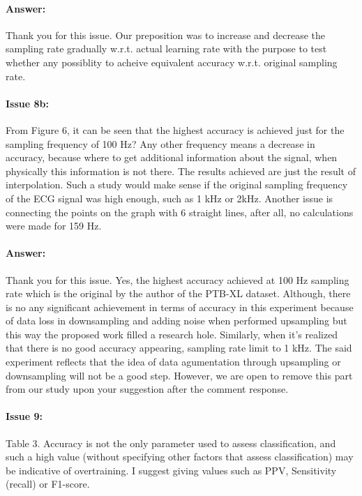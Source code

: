 \documentclass{article}
\begin{document}
\paragraph{Answer:}
Thank you for this issue. Our preposition was to increase and decrease the sampling rate gradually w.r.t. actual learning rate with the purpose to test whether any possiblity to acheive equivalent accuracy w.r.t. original sampling rate.  

\paragraph{Issue 8b:}
\begin{displayquote}
From Figure 6, it can be seen that the highest accuracy is achieved just for the sampling frequency of 100 Hz? Any other frequency means a decrease in accuracy, because where to get additional information about the signal, when physically this information is not there. The results achieved are just the result of interpolation. Such a study would make sense if the original sampling frequency of the ECG signal was high enough, such as 1 kHz or 2kHz. Another issue is connecting the points on the graph with 6 straight lines, after all, no calculations were made for 159 Hz.
\end{displayquote}

\paragraph{Answer:}
Thank you for this issue. Yes, the highest accuracy achieved at 100 Hz sampling rate which is the original by the author of the PTB-XL dataset. Although, there is no any significant achievement in terms of accuracy in this experiment because of data loss in downsampling and adding noise when performed upsampling but this way the proposed work filled a research hole. Similarly, when it's realized that there is no good accuracy appearing, sampling rate limit to 1 kHz. The said experiment reflects that the idea of data agumentation through upsampling or downsampling will not be a good step. However, we are open to remove this part from our study upon your suggestion after the comment response. 

\paragraph{Issue 9:}
\begin{displayquote}
Table 3. Accuracy is not the only parameter used to assess classification, and such a high value (without specifying other factors that assess classification) may be indicative of overtraining. I suggest giving values such as PPV, Sensitivity (recall) or F1-score.
\end{displayquote}
\end{document}
